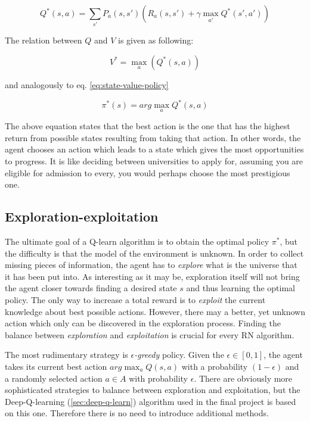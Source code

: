 \begin{equation}
    Q^{*}(s, a) = \sum_{s'} P_a(s, s') \left(R_a(s, s') + \gamma \max_{a'} Q^{*}(s', a') \right)
\label{eq:q-value}
\end{equation}

The relation between $Q$ and $V$ is given as following:

\begin{equation}
    V^{*} = \max_a \left(Q^{*} (s, a)\right)
\end{equation}

and analogously to eq. \ref{eq:state-value-policy}

\begin{equation}
    \pi^{*}(s) = arg \max_a Q^{*}(s, a)
\end{equation}

The above equation states that the best action is the one that has the highest return from possible states resulting from taking that action.
In other words, the agent chooses an action which leads to a state which gives the most opportunities to progress. It is like deciding between universities to apply for, assuming you are eligible for admission to every, you would perhaps choose the most prestigious one.

\subsection{Exploration-exploitation}
\label{sub:exploration-exploitation}

The ultimate goal of a Q-learn algorithm is to obtain the optimal policy $\pi^{*}$, but the difficulty is that the model of the environment is unknown. In order to collect missing pieces of information, the agent has to \emph{explore} what is the universe that it has been put into. As interesting as it may be, exploration itself will not bring the agent closer towards finding a desired state $s$ and thus learning the optimal policy. The only way to increase a total reward is to \emph{exploit} the current knowledge about best possible actions. However, there may a better, yet unknown action which only can be discovered in the exploration process. Finding the balance between \emph{exploration} and \emph{exploitation} is crucial for every RN algorithm.

The most rudimentary strategy is \emph{$\epsilon$-greedy} policy. Given the $\epsilon \in [0, 1]$, the agent takes its current best action $arg\max_a Q(s, a)$ with a probability $(1 - \epsilon)$ and a randomly selected action $a \in A$ with probability $\epsilon$. There are obviously more sophisticated strategies to balance between exploration and exploitation, but the Deep-Q-learning (\ref{sec:deep-q-learn}) algorithm used in the final project is based on this one. Therefore there is no need to introduce additional methods.

